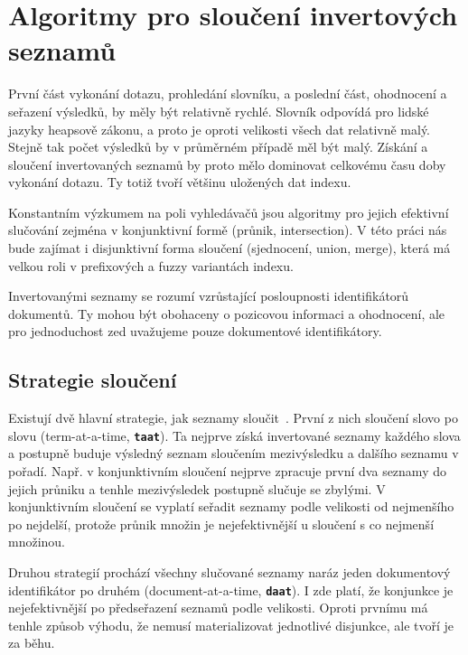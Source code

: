 \documentclass[11pt,letterpaper,oneside,openright]{book}
\newcommand{\bftt}[1]{\texttt{\textbf{#1}}}
\begin{document}


\section{Algoritmy pro sloučení invertových seznamů}
První část vykonání dotazu, prohledání slovníku, a poslední část, ohodnocení a
seřazení výsledků, by měly být relativně rychlé. Slovník odpovídá pro lidské
jazyky heapsově zákonu, a proto je oproti velikosti všech dat relativně malý.
Stejně tak počet výsledků by v průměrném případě měl být malý. Získání a
sloučení invertovaných seznamů by proto mělo dominovat celkovému času doby
vykonání dotazu. Ty totiž tvoří většinu uložených dat indexu.

Konstantním výzkumem na poli vyhledávačů jsou algoritmy pro jejich efektivní
slučování zejména v konjunktivní formě (průnik, intersection). V této práci nás
bude zajímat i disjunktivní forma sloučení (sjednocení, union, merge), která má
velkou roli v prefixových a fuzzy variantách indexu.

Invertovanými seznamy se rozumí vzrůstající posloupnosti identifikátorů
dokumentů. Ty mohou být obohaceny o pozicovou informaci a ohodnocení, ale pro
jednoduchost zed uvažujeme pouze dokumentové identifikátory.

\subsection{Strategie sloučení}
Existují dvě hlavní strategie, jak seznamy
sloučit~\cite{Lacour_efficiencycomparison}. První z nich sloučení slovo po
slovu (term-at-a-time, \bftt{taat}). Ta nejprve získá invertované seznamy
každého slova a postupně buduje výsledný seznam sloučením mezivýsledku a
dalšího seznamu v pořadí. Např. v konjunktivním sloučení nejprve zpracuje první
dva seznamy do jejich průniku a tenhle mezivýsledek postupně slučuje se
zbylými. V konjunktivním sloučení se vyplatí seřadit seznamy podle velikosti od
nejmenšího po nejdelší, protože průnik množin je nejefektivnější u sloučení s
co nejmenší množinou.

Druhou strategií prochází všechny slučované seznamy naráz jeden dokumentový
identifikátor po druhém (document-at-a-time, \bftt{daat}). I zde platí, že konjunkce
je nejefektivnější po předseřazení seznamů podle velikosti. Oproti prvnímu má
tenhle způsob výhodu, že nemusí materializovat jednotlivé disjunkce, ale tvoří
je za běhu.
\end{document}
